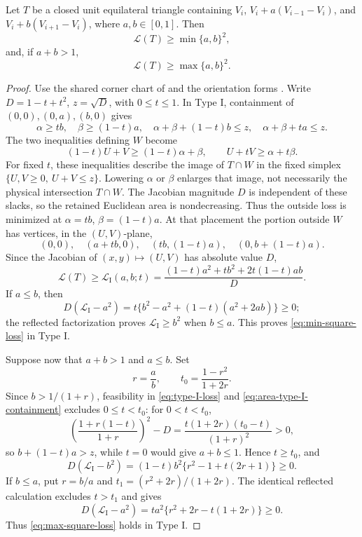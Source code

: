 \begin{theorem}
\label{thm:local-square-loss}
\label{lem:appendix-local-square-loss}

Let $T$ be a closed unit equilateral triangle containing
$V_i$, $V_i+a(V_{i-1}-V_i)$, and $V_i+b(V_{i+1}-V_i)$, where $a,b\in[0,1]$.
Then
\begin{equation}
 \mathcal L(T)\ge\min\{a,b\}^2,
 \label{eq:min-square-loss}
\end{equation}
and, if $a+b>1$,
\begin{equation}
 \mathcal L(T)\ge\max\{a,b\}^2.
 \label{eq:max-square-loss}
\end{equation}
\end{theorem}
\begin{proof}
Use the shared corner chart of  and the
orientation forms .
Write $D=1-t+t^2$, $z=\sqrt D$, with $0\le t\le1$.
In Type I, containment of
$(0,0),(0,a),(b,0)$ gives
\begin{equation}
 \alpha\ge tb,\quad \beta\ge(1-t)a,
 \quad \alpha+\beta+(1-t)b\le z,
 \quad \alpha+\beta+ta\le z.                 \label{eq:area-type-I-containment}
\end{equation}
The two inequalities defining $W$ become
\[
 (1-t)U+V\ge(1-t)\alpha+\beta,
 \qquad U+tV\ge\alpha+t\beta.
\]
For fixed $t$, these inequalities describe the image of $T\cap W$ in the
fixed simplex $\{U,V\ge0,\ U+V\le z\}$. Lowering $\alpha$ or $\beta$
enlarges that image, not necessarily the physical intersection $T\cap W$.
The Jacobian magnitude $D$ is independent of these slacks, so the retained
Euclidean area is nondecreasing. Thus the outside loss is minimized at
$\alpha=tb$, $\beta=(1-t)a$. At that placement the portion outside $W$
has vertices, in the $(U,V)$-plane,
\[
 (0,0),\quad(a+tb,0),\quad(tb,(1-t)a),
 \quad(0,b+(1-t)a).
\]
Since the Jacobian of $(x,y)\mapsto(U,V)$ has absolute value $D$,
\begin{equation}
 \mathcal L(T)\ge \mathcal L_{\mathrm I}(a,b;t)
 =\frac{(1-t)a^2+tb^2+2t(1-t)ab}{D}.          \label{eq:type-I-loss}
\end{equation}
If $a\le b$, then
\[
 D(\mathcal L_{\mathrm I}-a^2)
 =t\{b^2-a^2+(1-t)(a^2+2ab)\}\ge0;
\]
the reflected factorization proves $\mathcal L_{\mathrm I}\ge b^2$ when $b\le a$.
This proves \eqref{eq:min-square-loss} in Type I.

Suppose now that $a+b>1$ and $a\le b$.  Set
\[
 r=\frac ab,\qquad t_0=\frac{1-r^2}{1+2r}.
\]
Since $b>1/(1+r)$, feasibility in \eqref{eq:type-I-loss} and
\eqref{eq:area-type-I-containment} excludes
$0\le t<t_0$: for $0<t<t_0$,
\[
 \left(\frac{1+r(1-t)}{1+r}\right)^2-D
 =\frac{t(1+2r)(t_0-t)}{(1+r)^2}>0,
\]
so $b+(1-t)a>z$, while $t=0$ would give $a+b\le1$.  Hence $t\ge t_0$, and
\[
 D(\mathcal L_{\mathrm I}-b^2)
 =(1-t)b^2\{r^2-1+t(2r+1)\}\ge0.
\]
If $b\le a$, put $r=b/a$ and
$t_1=(r^2+2r)/(1+2r)$.  The identical reflected calculation excludes
$t>t_1$ and gives
\[
 D(\mathcal L_{\mathrm I}-a^2)
 =ta^2\{r^2+2r-t(1+2r)\}\ge0.
\]
Thus \eqref{eq:max-square-loss} holds in Type I.


\end{proof}
